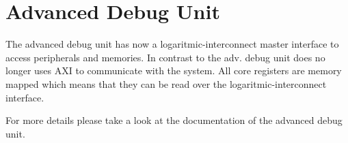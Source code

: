 \chapter{Advanced Debug Unit}

The advanced debug unit has now a logaritmic-interconnect master interface to access peripherals and memories. In contrast to \pulpino the adv. debug unit does no longer uses AXI to communicate with the system.
All core registers are memory mapped which means that they can be read over
 the logaritmic-interconnect interface.

For more details please take a look at the documentation of the advanced debug unit.


